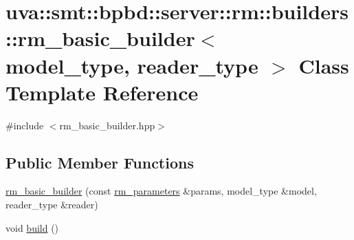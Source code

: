 \hypertarget{classuva_1_1smt_1_1bpbd_1_1server_1_1rm_1_1builders_1_1rm__basic__builder}{}\section{uva\+:\+:smt\+:\+:bpbd\+:\+:server\+:\+:rm\+:\+:builders\+:\+:rm\+\_\+basic\+\_\+builder$<$ model\+\_\+type, reader\+\_\+type $>$ Class Template Reference}
\label{classuva_1_1smt_1_1bpbd_1_1server_1_1rm_1_1builders_1_1rm__basic__builder}


{\ttfamily \#include $<$rm\+\_\+basic\+\_\+builder.\+hpp$>$}

\subsection*{Public Member Functions}
\begin{DoxyCompactItemize}
\item 
\hyperlink{classuva_1_1smt_1_1bpbd_1_1server_1_1rm_1_1builders_1_1rm__basic__builder_a290adecc76ea9e111568158a63b17b33}{rm\+\_\+basic\+\_\+builder} (const \hyperlink{structuva_1_1smt_1_1bpbd_1_1server_1_1rm_1_1rm__parameters}{rm\+\_\+parameters} \&params, model\+\_\+type \&model, reader\+\_\+type \&reader)
\item 
void \hyperlink{classuva_1_1smt_1_1bpbd_1_1server_1_1rm_1_1builders_1_1rm__basic__builder_aac1dee2dc58cf5f80f1e32bd5c2f66a9}{build} ()
\end{DoxyCompactItemize}
